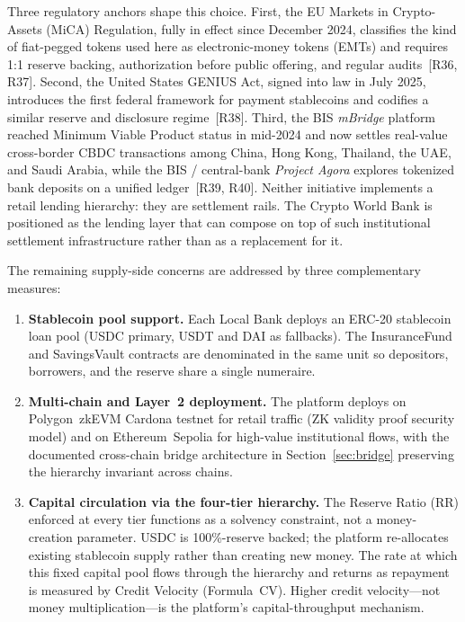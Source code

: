 \documentclass[12pt,a4paper]{report}
\begin{document}
Three regulatory anchors shape this choice. First, the EU Markets in Crypto-Assets (MiCA) Regulation, fully in effect since December 2024, classifies the kind of fiat-pegged tokens used here as electronic-money tokens (EMTs) and requires 1{:}1 reserve backing, authorization before public offering, and regular audits~[R36, R37]. Second, the United States GENIUS Act, signed into law in July 2025, introduces the first federal framework for payment stablecoins and codifies a similar reserve and disclosure regime~[R38]. Third, the BIS \textit{mBridge} platform reached Minimum Viable Product status in mid-2024 and now settles real-value cross-border CBDC transactions among China, Hong Kong, Thailand, the UAE, and Saudi Arabia, while the BIS / central-bank \textit{Project Agora} explores tokenized bank deposits on a unified ledger~[R39, R40]. Neither initiative implements a retail lending hierarchy: they are settlement rails. The Crypto World Bank is positioned as the lending layer that can compose on top of such institutional settlement infrastructure rather than as a replacement for it.

The remaining supply-side concerns are addressed by three complementary measures:

\begin{enumerate}[noitemsep]
\item \textbf{Stablecoin pool support.} Each Local Bank deploys an ERC-20 stablecoin loan pool (USDC primary, USDT and DAI as fallbacks). The InsuranceFund and SavingsVault contracts are denominated in the same unit so depositors, borrowers, and the reserve share a single numeraire.
\item \textbf{Multi-chain and Layer~2 deployment.} The platform deploys on Polygon~zkEVM Cardona testnet for retail traffic (ZK validity proof security model) and on Ethereum~Sepolia for high-value institutional flows, with the documented cross-chain bridge architecture in Section~\ref{sec:bridge} preserving the hierarchy invariant across chains.
\item \textbf{Capital circulation via the four-tier hierarchy.} The Reserve Ratio (RR) enforced at every tier functions as a solvency constraint, not a money-creation parameter. USDC is 100\%-reserve backed; the platform re-allocates existing stablecoin supply rather than creating new money. The rate at which this fixed capital pool flows through the hierarchy and returns as repayment is measured by Credit Velocity (Formula~CV). Higher credit velocity---not money multiplication---is the platform's capital-throughput mechanism.
\end{enumerate}
\end{document}
